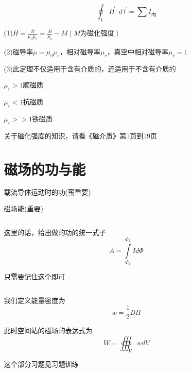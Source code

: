 \documentclass[lang=cn,10pt]{elegantbook}
\begin{document}
	\subsection{\color{red}}
	\begin{theorem}[磁介质高斯定理]
		\begin{equation*}
			\oint_L{\overrightarrow{H}\cdot d\overrightarrow{l}}=\sum{I_{\text{内}}}
		\end{equation*}
	\end{theorem}
	\begin{note}
		(1)$H=\frac{B}{\mu _0\mu _r}=\frac{B}{\mu _0}-M\left( M\text{为磁化强度} \right) $
		
		(2)$\text{磁导率}\mu =\mu _0\mu _r\text{，相对磁导率}\mu _r\text{，真空中相对磁导率}\mu _r=1$
		
		(3)此定理不仅适用于含有介质的，还适用于不含有介质的
		
	\end{note}
	\begin{remark}
	$	\mu _r>1$顺磁质
		
		$\mu _r<1$抗磁质
		
		$\mu _r>>1$铁磁质
	\end{remark}
	\begin{remark}
		关于磁化强度的知识，请看《磁介质》第1页到19页
	\end{remark}
	
	\section{磁场的功与能}
	\begin{introduction}
		\item 载流导体运动时的功(蛮重要)
		\item 磁场能(重要)
	\end{introduction}
	\subsection{\color{red}}
	这里的话，给出做的功的统一式子
	\begin{equation*}
		A=\int\limits_{\varPhi _1}^{\varPhi _2}{Id\varPhi}
	\end{equation*}
	
	只需要记住这个即可
	\subsection{\color{red}}
	\begin{definition}[能量密度]
		我们定义能量密度为
		\begin{equation*}
			w=\frac{1}{2}BH
		\end{equation*}
	\end{definition}
	\begin{note}
		此时空间站的磁场的表达式为
		\begin{equation*}
			W=\oiiint_V{wdV}
		\end{equation*}
	\end{note}
	这个部分习题见习题训练
\end{document}
